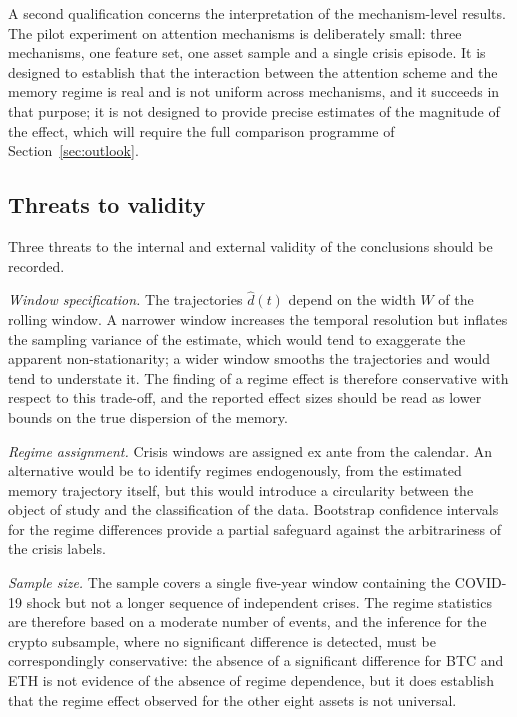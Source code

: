 \documentclass[journal]{IEEEtran}
\begin{document}
A second qualification concerns the interpretation of the mechanism-level results. The pilot
experiment on attention mechanisms is deliberately small: three mechanisms, one feature set, one
asset sample and a single crisis episode. It is designed to establish that the interaction
between the attention scheme and the memory regime is real and is not uniform across mechanisms,
and it succeeds in that purpose; it is not designed to provide precise estimates of the magnitude
of the effect, which will require the full comparison programme of Section~\ref{sec:outlook}.

\subsection{Threats to validity}

Three threats to the internal and external validity of the conclusions should be recorded.

\emph{Window specification.} The trajectories $\hat d(t)$ depend on the width $W$ of the rolling
window. A narrower window increases the temporal resolution but inflates the sampling variance
of the estimate, which would tend to exaggerate the apparent non-stationarity; a wider window
smooths the trajectories and would tend to understate it. The finding of a regime effect is
therefore conservative with respect to this trade-off, and the reported effect sizes should be
read as lower bounds on the true dispersion of the memory.

\emph{Regime assignment.} Crisis windows are assigned ex ante from the calendar. An alternative
would be to identify regimes endogenously, from the estimated memory trajectory itself, but this
would introduce a circularity between the object of study and the classification of the data.
Bootstrap confidence intervals for the regime differences provide a partial safeguard against
the arbitrariness of the crisis labels.

\emph{Sample size.} The sample covers a single five-year window containing the COVID-19 shock but
not a longer sequence of independent crises. The regime statistics are therefore based on a
moderate number of events, and the inference for the crypto subsample, where no significant
difference is detected, must be correspondingly conservative: the absence of a significant
difference for BTC and ETH is not evidence of the absence of regime dependence, but it does
establish that the regime effect observed for the other eight assets is not universal.
\end{document}
